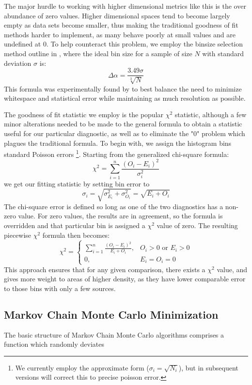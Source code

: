 \documentclass[twocolumn,letterpaper,10pt]{article}
\begin{document}
The major hurdle to working with higher dimensional metrics like this is the over abundance of zero values. Higher dimensional spaces tend to become largely empty as data sets become smaller, thus making the traditional goodness of fit methods harder to implement, as many behave poorly at small values and are undefined at 0. To help counteract this problem, we employ the binsize selection method outline in \citet{binsize}, where the ideal bin size for a sample of size $N$ with standard deviation $\sigma$ is: 
$$
\Delta \alpha=\frac{3.49\sigma}{\sqrt[3]{N}}$$
 This formula was experimentally found by \citet{binsize} to best balance the need to minimize whitespace and statistical error while maintaining as much resolution as possible.

The goodness of fit statistic we employ is the popular $\chi^2$ statistic, although a few minor alterations needed to be made to the general formula to obtain a statistic useful for our particular diagnostic, as well as to eliminate the "0" problem which plagues the traditional formula. To begin with, we assign the histogram bins standard Poisson errors \footnote{We currently employ the approximate form ($\sigma_i=\sqrt{N_i}$), but in subsequent versions will correct this to precise poisson error.}. Starting from the generalized chi-square formula:
$$
\chi^2=\sum\limits_{i=1}^n \frac{(O_i-E_i)^2}{\sigma_i^2}
$$
we get our fitting statistic by setting bin error to 
$$
\sigma_i=\sqrt{\sigma_{E_i}^2+\sigma_{O_i}^2}=\sqrt{E_i+O_i}
$$ 
The chi-square error is defined so long as one of the two diagnostics has a non-zero value. For zero values, the results are in agreement, so the formula is overridden and that particular bin is assigned a $\chi^2$ value of zero. The resulting piecewise $\chi^2$ formula then becomes:
$$
\chi^2=
\begin{cases}
\sum\limits_{i=1}^n \frac{(O_i-E_i)^2}{E_i+O_i}, & O_i > 0 \text{ or } E_i > 0 \\
0, & E_i=O_i=0
\end{cases}
$$
This approach ensures that for any given comparison, there exists a $\chi^2$ value, and gives more weight to areas of higher density, as they have lower comparable error to those bins with only a few sources.

\subsection{Markov Chain Monte Carlo Minimization}

The basic structure of Markov Chain Monte Carlo algorithms comprises a function which randomly deviates\citet{dunkley05}
\end{document}
